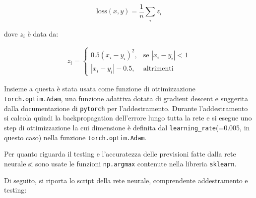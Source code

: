 \documentclass[11pt]{article}
\begin{document}
\begin{equation*}
\text{loss}(x, y) = \frac{1}{n} \sum_{i} z_{i}
\end{equation*}

dove \(z_i\) è data da:

\begin{equation*}
\begin{split}z_{i} =
\begin{cases}
0.5 (x_i - y_i)^2, & \text{se } |x_i - y_i| < 1 \\
|x_i - y_i| - 0.5, & \text{altrimenti }
\end{cases}\end{split}
\end{equation*}

Insieme a questa è stata usata come funzione di ottimizzazione
\texttt{torch.optim.Adam}, una funzione adattiva dotata di gradient
descent e suggerita dalla documentazione di \texttt{pytorch} per
l'addestramento. Durante l'addestramento si calcola quindi la
backpropagation dell'errore lungo tutta la rete e si esegue uno step di
ottimizzazione la cui dimensione è definita dal
\texttt{learning\_rate}(=0.005, in questo caso) nella funzione
\texttt{torch.optim.Adam}.

Per quanto riguarda il testing e l'accuratezza delle previsioni fatte
dalla rete neurale si sono usate le funzioni \texttt{np.argmax}
contenute nella libreria \texttt{sklearn}.

Di seguito, si riporta lo script della rete neurale, comprendente
addestramento e testing:
\end{document}
